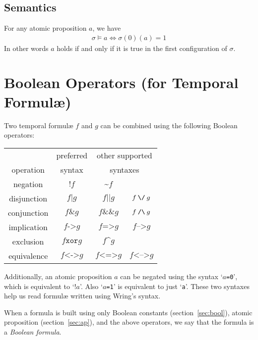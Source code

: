 \documentclass[a4paper,twoside,10pt,DIV=12,draft]{scrreprt}
\DeclareMathOperator{\NOT}{\texttt{!}}
\DeclareMathOperator{\NOTALT}{\texttt{\char`~}}
\newcommand{\XOR}{\mathbin{\texttt{xor}}}
\newcommand{\XORALT}{\mathbin{\texttt{\char`^}}}
\newcommand{\IMPLIES}{\mathbin{\texttt{->}}}
\newcommand{\IMPLIESALT}{\mathbin{\texttt{=>}}}
\newcommand{\IMPLIESALTT}{\mathbin{\texttt{-->}}}
\newcommand{\EQUIV}{\mathbin{\texttt{<->}}}
\newcommand{\EQUIVALT}{\mathbin{\texttt{<=>}}}
\newcommand{\EQUIVALTT}{\mathbin{\texttt{<-->}}}
\newcommand{\OR}{\mathbin{\texttt{|}}}
\newcommand{\ORALT}{\mathbin{\texttt{||}}}
\newcommand{\ORALTT}{\mathbin{\texttt{\char`\\/}}}
\newcommand{\AND}{\mathbin{\texttt{\&}}}
\newcommand{\ANDALT}{\mathbin{\texttt{\&\&}}}
\newcommand{\ANDALTT}{\mathbin{\texttt{/\char`\\}}}
\newcommand{\0}{\texttt{0}}
\newcommand{\1}{\texttt{1}}
\newcommand\samp[1]{`\texttt{#1}'}
\begin{document}
\subsection{Semantics}

For any atomic proposition $a$, we have
\begin{align*}
  \sigma \vDash a \iff \sigma(0)(a) = 1
\end{align*}
In other words $a$ holds if and only if it is true in the first
configuration of $\sigma$.

\section{Boolean Operators (for Temporal Formul\ae{})}\label{sec:boolops}

Two temporal formul\ae{} $f$ and $g$ can be combined using the
following Boolean operators:

\begin{center}
\begin{tabular}{cccc}
              & preferred & \multicolumn{2}{c}{other supported} \\
   operation  & syntax    & \multicolumn{2}{c}{syntaxes}\\
  \hline
  negation    & $\NOT f$      & $\NOTALT f$  \\
  disjunction & $f\OR g$      & $f\ORALT g$      & $f\ORALTT g$ \\
  conjunction & $f\AND g$     & $f\ANDALT g$     & $f\ANDALTT g$ \\
  implication & $f\IMPLIES g$ & $f\IMPLIESALT g$ & $f\IMPLIESALTT g$\\
  exclusion   & $f\XOR g$     & $f\XORALT g$ \\
  equivalence & $f\EQUIV g$   & $f\EQUIVALT g$   & $f\EQUIVALTT g$ \\
\end{tabular}
\end{center}

Additionally, an atomic proposition $a$ can be negated using the
syntax \samp{$a$=0}, which is equivalent to \samp{$\NOT a$}.  Also
\samp{$a$=1} is equivalent to just \samp{a}.  These two syntaxes help
us read formul\ae{} written using Wring's syntax.

\label{def:boolform}
When a formula is built using only Boolean constants
(section~\ref{sec:bool}), atomic proposition (section~\ref{sec:ap}),
and the above operators, we say that the formula is a \emph{Boolean
  formula}.
\end{document}
